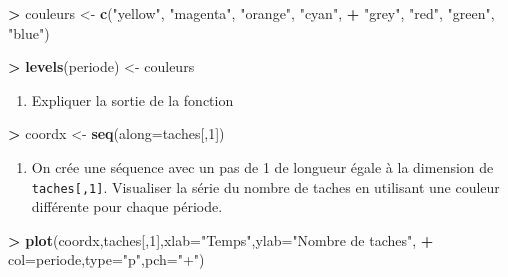 \documentclass[]{article}
\newenvironment{Shaded}{\begin{snugshade}}{\end{snugshade}}
\newcommand{\DataTypeTok}[1]{\textcolor[rgb]{0.13,0.29,0.53}{#1}}
\newcommand{\DecValTok}[1]{\textcolor[rgb]{0.00,0.00,0.81}{#1}}
\newcommand{\KeywordTok}[1]{\textcolor[rgb]{0.13,0.29,0.53}{\textbf{#1}}}
\newcommand{\NormalTok}[1]{#1}
\newcommand{\OperatorTok}[1]{\textcolor[rgb]{0.81,0.36,0.00}{\textbf{#1}}}
\newcommand{\StringTok}[1]{\textcolor[rgb]{0.31,0.60,0.02}{#1}}
\providecommand{\tightlist}{%
  \setlength{\itemsep}{0pt}\setlength{\parskip}{0pt}}
\theoremstyle{definition}
\theoremstyle{definition}
\theoremstyle{definition}
\theoremstyle{remark}
\begin{document}
\begin{Shaded}
\begin{Highlighting}[]
\OperatorTok{>}\StringTok{ }\NormalTok{couleurs <-}\StringTok{ }\KeywordTok{c}\NormalTok{(}\StringTok{"yellow"}\NormalTok{, }\StringTok{"magenta"}\NormalTok{, }\StringTok{"orange"}\NormalTok{, }\StringTok{"cyan"}\NormalTok{,}
\OperatorTok{+}\StringTok{               "grey"}\NormalTok{, }\StringTok{"red"}\NormalTok{, }\StringTok{"green"}\NormalTok{, }\StringTok{"blue"}\NormalTok{)}
\end{Highlighting}
\end{Shaded}

\begin{Shaded}
\begin{Highlighting}[]
\OperatorTok{>}\StringTok{ }\KeywordTok{levels}\NormalTok{(periode) <-}\StringTok{ }\NormalTok{couleurs}
\end{Highlighting}
\end{Shaded}

\begin{enumerate}
\def\labelenumi{\arabic{enumi}.}
\setcounter{enumi}{3}
\tightlist
\item
  Expliquer la sortie de la fonction
\end{enumerate}

\begin{Shaded}
\begin{Highlighting}[]
\OperatorTok{>}\StringTok{ }\NormalTok{coordx <-}\StringTok{ }\KeywordTok{seq}\NormalTok{(}\DataTypeTok{along=}\NormalTok{taches[,}\DecValTok{1}\NormalTok{])}
\end{Highlighting}
\end{Shaded}

\begin{enumerate}
\def\labelenumi{\arabic{enumi}.}
\setcounter{enumi}{4}
\tightlist
\item
  On crée une séquence avec un pas de 1 de longueur égale à la dimension de \texttt{taches{[},1{]}}. Visualiser la série du nombre de taches en utilisant une couleur différente pour chaque période.
\end{enumerate}

\begin{Shaded}
\begin{Highlighting}[]
\OperatorTok{>}\StringTok{ }\KeywordTok{plot}\NormalTok{(coordx,taches[,}\DecValTok{1}\NormalTok{],}\DataTypeTok{xlab=}\StringTok{"Temps"}\NormalTok{,}\DataTypeTok{ylab=}\StringTok{"Nombre de taches"}\NormalTok{,}
\OperatorTok{+}\StringTok{      }\DataTypeTok{col=}\NormalTok{periode,}\DataTypeTok{type=}\StringTok{"p"}\NormalTok{,}\DataTypeTok{pch=}\StringTok{"+"}\NormalTok{)}
\end{Highlighting}
\end{Shaded}
\end{document}
